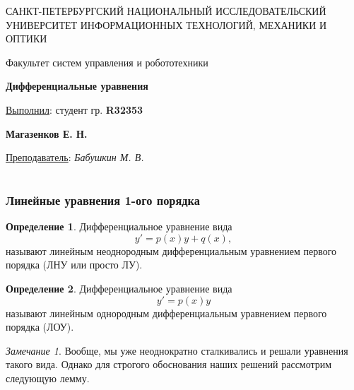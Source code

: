 \documentclass[a5paper, 10pt]{article}
\theoremstyle{definition}
\newtheorem{Def}{Определение}
\theoremstyle{plain}
\theoremstyle{remark}
\newtheorem*{Note}{Замечание}
\newcommand*{\titlePage}{
	\thispagestyle{title}
	\begingroup
	\begin{center}
%		
		\vspace*{6ex}
		
		{\small
			САНКТ-ПЕТЕРБУРГСКИЙ НАЦИОНАЛЬНЫЙ ИССЛЕДОВАТЕЛЬСКИЙ УНИВЕРСИТЕТ ИНФОРМАЦИОННЫХ ТЕХНОЛОГИЙ, МЕХАНИКИ И ОПТИКИ	
		}
		
		\vspace*{2ex}
		
		{\normalsize
			Факультет систем управления и робототехники
		}
		
		\vspace*{15ex}
		
		{\Large \bfseries 
			Дифференциальные уравнения
		}
	\end{center}
	\vspace*{20ex}
	\begin{flushright}
		{\large 
			\underline{Выполнил}: студент гр. \textbf{R32353}\\
			\begin{flushright}
				\textbf{Магазенков Е. Н.}\\
			\end{flushright}
		}
		
		\vspace*{5ex}
		
		{\large 
			\underline{Преподаватель}: \textit{Бабушкин М. В.}
		}
	\end{flushright}	
	\newpage
	\setcounter{page}{1}
	\endgroup}
\begin{document}
	\titlePage
	\pagestyle{style}
	\part{}
	\section[ЛУ 1-ого порядка]{Линейные уравнения 1-ого порядка}
	\begin{Def}
		Дифференциальное уравнение вида 
		\begin{equation}
			y' = p(x) y + q(x),
		\end{equation}
		называют линейным неоднородным дифференциальным уравнением первого порядка (\textsc{ЛНУ} или просто \textsc{ЛУ}).
	\end{Def}
	
	\begin{Def}
		Дифференциальное уравнение вида 
		\begin{equation}
			y' = p(x) y
		\end{equation}
		называют линейным однородным дифференциальным уравнением первого порядка (\textsc{ЛОУ}).
	\end{Def}
	\begin{Note}
		Вообще, мы уже неоднократно сталкивались и решали уравнения такого вида. Однако для строгого обоснования наших решений рассмотрим следующую лемму.
	\end{Note}
\end{document}
